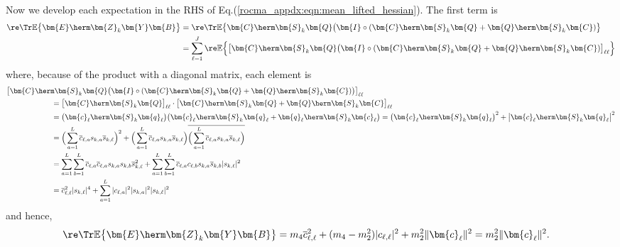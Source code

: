 Now we develop each expectation in the RHS of Eq.(\ref{rocma_appdx:eqn:mean_lifted_hessian}). The first term is
\begin{align}
	\re\Tr\mathbb{E}\big\{\bm{E}\herm\bm{Z}_k\bm{Y}\bm{B}\big\}&=\re\Tr\mathbb{E}\big\{\bm{C}\herm\bm{S}_k\bm{Q}\big(\bm{I}\circ(\bm{C}\herm\bm{S}_k\bm{Q}+\bm{Q}\herm\bm{S}_k\bm{C})\big\}\nonumber\\
	&=\sum_{\ell=1}^J\re\mathbb{E}\Big\{\big[\bm{C}\herm\bm{S}_k\bm{Q}\big(\bm{I}\circ(\bm{C}\herm\bm{S}_k\bm{Q}+\bm{Q}\herm\bm{S}_k\bm{C})\big]_{\ell\ell}\Big\}\nonumber
\end{align}
where, because of the product with a diagonal matrix, each element is
\begin{align}
	&\big[\bm{C}\herm\bm{S}_k\bm{Q}\big(\bm{I}\circ(\bm{C}\herm\bm{S}_k\bm{Q}+\bm{Q}\herm\bm{S}_k\bm{C})\big)\big]_{\ell\ell}\nonumber\\
	&\qquad\qquad\qquad=\big[\bm{C}\herm\bm{S}_k\bm{Q}\big]_{\ell\ell}\cdot\big[\bm{C}\herm\bm{S}_k\bm{Q}+\bm{Q}\herm\bm{S}_k\bm{C}\big]_{\ell\ell}\nonumber\\
	&\qquad\qquad\qquad=\big(\bm{c}_{\ell}\herm\bm{S}_k\bm{q}_{\ell}\big)\big(\bm{c}_{\ell}\herm\bm{S}_k\bm{q}_{\ell}+\bm{q}_{\ell}\herm\bm{S}_k\bm{c}_{\ell}\big)
	=\big(\bm{c}_{\ell}\herm\bm{S}_k\bm{q}_{\ell}\big)^2+\big|\bm{c}_{\ell}\herm\bm{S}_k\bm{q}_{\ell}\big|^2%
	\nonumber\\
	&\qquad\qquad\qquad=\Big(\sum_{a=1}^L\overline{c}_{\ell,a}s_{k,a}\overline{s}_{k,\ell}\Big)^2+\Big(\sum_{a=1}^L\overline{c}_{\ell,a}s_{k,a}\overline{s}_{k,\ell}\Big)\overline{\Big(\sum_{a=1}^L\overline{c}_{\ell,a}s_{k,a}\overline{s}_{k,\ell}\Big)}
	\nonumber\\
	&\qquad\qquad\qquad=\sum_{a=1}^L\sum_{b=1}^L\overline{c}_{\ell,a}\overline{c}_{\ell,a}s_{k,a}s_{k,b}\overline{s}_{k,\ell}^2+\sum_{a=1}^L\sum_{b=1}^L\overline{c}_{\ell,a}{c}_{\ell,b}s_{k,a}\overline{s}_{k,b}|{s}_{k,\ell}|^2
	\nonumber\\
	&\qquad\qquad\qquad=\overline{c}_{\ell,\ell}^2|{s}_{k,\ell}|^4+\sum_{a=1}^L|c_{\ell,a}|^2|s_{k,a}|^2|{s}_{k,\ell}|^2
	\nonumber
\end{align}
and hence, 
\begin{align}
	\re\Tr\mathbb{E}\big\{\bm{E}\herm\bm{Z}_k\bm{Y}\bm{B}\big\}&= m_4\overline{c}_{\ell,\ell}^2+(m_4-m_2^2)|c_{\ell,\ell}|^2+m_2^2\|\bm{c}_{\ell}\|^2=m_2^2\|\bm{c}_{\ell}\|^2.\label{rocma_appdx:eqn:lifted_hessian_mean_1}
\end{align}


